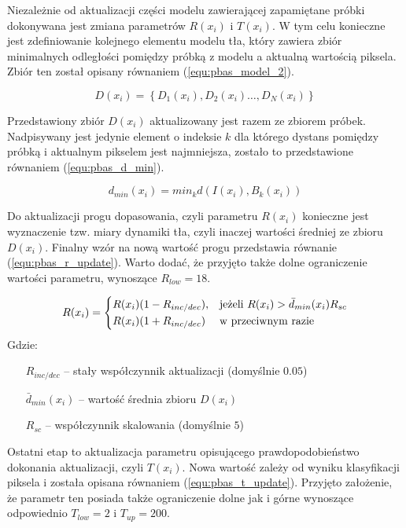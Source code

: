\documentclass[b5paper,10pt,twoside]{article}
\begin{document}
{Niezależnie od aktualizacji części modelu zawierającej zapamiętane próbki dokonywana jest zmiana parametrów $R(x_i)$ i $T(x_i)$. W tym celu konieczne jest zdefiniowanie kolejnego elementu modelu tła, który zawiera zbiór minimalnych odległości pomiędzy próbką z modelu a aktualną wartością piksela. Zbiór ten został opisany równaniem (\ref{equ:pbas_model_2}). 
 
	\begin{equation}
		D(x_i)= \left\{ D_1(x_i), D_2(x_i) \dotsc, D_N(x_i) \right\}
	\label{equ:pbas_model_2}	
	\end{equation}

Przedstawiony zbiór $D(x_i)$ aktualizowany jest razem ze zbiorem próbek. Nadpisywany jest jedynie element o indeksie $k$ dla którego dystans pomiędzy próbką i aktualnym pikselem jest najmniejsza, zostało to przedstawione równaniem (\ref{equ:pbas_d_min}).
	
	\begin{equation}
		d_{min}(x_i) = min_k d(I(x_i), B_k(x_i))
	\label{equ:pbas_d_min}	
	\end{equation}

Do aktualizacji progu dopasowania, czyli parametru $R(x_i)$ konieczne jest wyznaczenie tzw. miary dynamiki tła, czyli inaczej wartości średniej ze zbioru $D(x_i)$. Finalny wzór na nową wartość progu przedstawia równanie (\ref{equ:pbas_r_update}). Warto dodać, że przyjęto także dolne ograniczenie wartości parametru, wynoszące $R_{low} = 18$.
    
    \begin{equation}
	    R(x_i) = 
		\begin{dcases}
    		R(x_i)(1-R_{inc/dec}), & \text{jeżeli } R(x_i) > \bar{d}_{min}(x_i)R_{sc} \\
    		R(x_i)(1+R_{inc/dec}) & \text{w przeciwnym razie} 
		\end{dcases}
	\label{equ:pbas_r_update}	
	\end{equation}
Gdzie:
\begin{itemize}
	\item[$R_{inc/dec}$] -- stały współczynnik aktualizacji (domyślnie $0.05$)
	\item[$\bar{d}_{min}(x_i)$] -- wartość średnia zbioru $D(x_i)$
	\item[$R_{sc}$] -- współczynnik skalowania (domyślnie $5$)
\end{itemize}

Ostatni etap to aktualizacja parametru opisującego prawdopodobieństwo dokonania aktualizacji, czyli $T(x_i)$. Nowa wartość zależy od wyniku klasyfikacji piksela i została opisana równaniem (\ref{equ:pbas_t_update}). Przyjęto założenie, że parametr ten posiada także ograniczenie dolne jak i górne wynoszące odpowiednio $T_{low}=2$ i $T_{up}=200$. 

}
\end{document}
